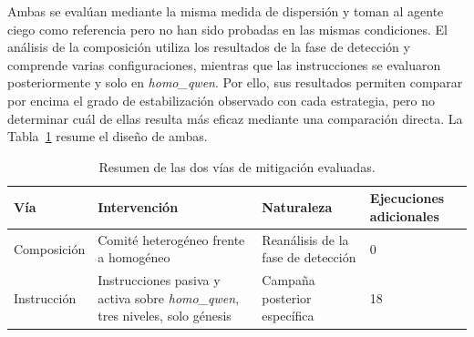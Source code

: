 Ambas se evalúan mediante la misma medida de dispersión y toman al agente ciego como referencia pero no han sido probadas en las mismas condiciones. El análisis de la composición utiliza los resultados de la fase de detección y comprende varias configuraciones, mientras que las instrucciones se evaluaron posteriormente y solo en \textit{homo\_qwen}. Por ello, sus resultados permiten comparar por encima el grado de estabilización observado con cada estrategia, pero no determinar cuál de ellas resulta más eficaz mediante una comparación directa. La Tabla~\ref{tab:mitigacion} resume el diseño de ambas.


\begin{table}[htbp]
	\centering
	\caption{Resumen de las dos vías de mitigación evaluadas.}
	\label{tab:mitigacion}
	\small
	\begin{tabular}{p{2.6cm} p{5.0cm} p{2.8cm} p{2.2cm}}
		\hline
		\textbf{Vía} & \textbf{Intervención} &
		\textbf{Naturaleza} &
		\textbf{Ejecuciones adicionales} \\
		\hline
		
		Composición
		& Comité heterogéneo frente a homogéneo
		& Reanálisis de la fase de detección
		& 0 \\
		
		Instrucción
		& Instrucciones pasiva y activa sobre
		\textit{homo\_qwen}, tres niveles, solo génesis
		& Campaña posterior específica
		& 18 \\
		
		\hline
	\end{tabular}
\end{table}